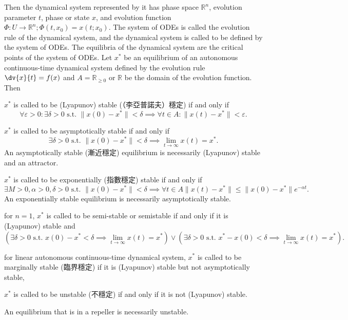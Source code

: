 \documentclass[a4paper,12pt]{report}
\begin{document}
Then the dynamical system represented by it has phase space $\mathbb{R}^n$, evolution parameter $t$, phase or state $x$, and evolution function $\Phi\colon U\to\mathbb{R}^n;\Phi(t,x_0)=x(t;x_0)$. The system of ODEs is called the evolution rule of the dynamical system, and the dynamical system is called to be defined by the system of ODEs. The equilibria of the dynamical system are the critical points of the system of ODEs.
Let $x^*$ be an equilibrium of an autonomous continuous-time dynamical system defined by the evolution rule $\dv{x}{t}=f(x)$ and $A=\mathbb{R}_{\geq 0}$ or $\mathbb{R}$ be the domain of the evolution function. Then
\bit
\item $x^*$ is called to be (Lyapunov) stable (（李亞普諾夫）穩定) if and only if
    \[\forall\varepsilon>0\colon\exists\delta>0\text{\ s.t.\ }\|x(0)-x^*\|<\delta\implies\forall t\in A\colon\|x(t)-x^*\|<\varepsilon.\]
\item $x^*$ is called to be asymptotically stable if and only if
    \[\exists\delta>0\text{\ s.t.\ }\|x(0)-x^*\|<\delta\implies\lim_{t\to\infty}x(t)=x^*.\]
An asymptotically stable (漸近穩定) equilibrium is necessarily (Lyapunov) stable and an attractor.
\item $x^*$ is called to be exponentially (指數穩定) stable if and only if
    \[\exists M>0,\alpha>0,\delta>0\text{\ s.t.\ }\|x(0)-x^*\|<\delta\implies\forall t\in A\|x(t)-x^*\|\leq\|x(0)-x^*\|e^{-\alpha t}.\]
    An exponentially stable equilibrium is necessarily asymptotically stable.
\item for $n=1$, $x^*$ is called to be semi-stable or semistable if and only if it is (Lyapunov) stable and
    \[(\exists\delta>0\text{\ s.t.\ }x(0)-x^*<\delta\implies\lim_{t\to\infty}x(t)=x^*)\lor (\exists\delta>0\text{\ s.t.\ }x^*-x(0)<\delta\implies\lim_{t\to\infty}x(t)=x^*).\]
\item for linear autonomous continuous-time dynamical system, $x^*$ is called to be marginally stable (臨界穩定) if it is (Lyapunov) stable but not asymptotically stable,
\item $x^*$ is called to be unstable (不穩定) if and only if it is not (Lyapunov) stable.

An equilibrium that is in a repeller is necessarily unstable.
\eit
\end{document}
